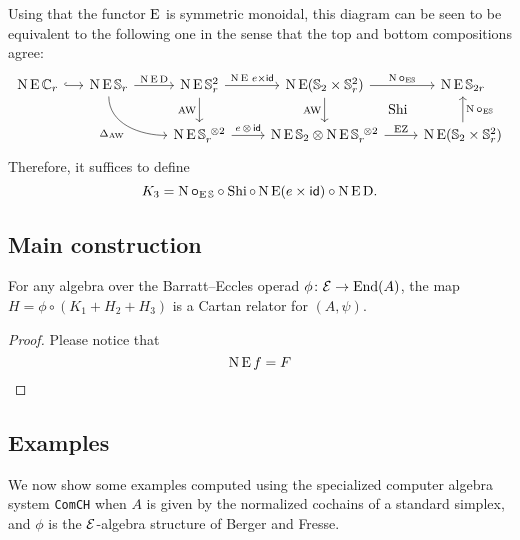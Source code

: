 Using that the functor $\operatorname{E}$ is symmetric monoidal, this diagram can be seen to be equivalent to the following one in the sense that the top and bottom compositions agree:
\[
\begin{tikzcd}
	\chains\EE\cyc_r
	\rar[hook]
	&[-10pt]
	\chains\EE\sym_r
	\rar["\chains\EE\rD"]
	\arrow[dr,in=180,out=-90,"\Delta_{\AW}"'] &
	\chains\EE\sym_r^2
	\rar["\chains\EE \, e \times \id"]
	\dar["\AW"'] &[0pt]
	\chains\EE(\sym_2 \times \sym_r^2)
	\rar["\chains\bcirc_{\EE\!\sym}"]
	\dar["\AW"']&
	\chains\EE\sym_{2r} \\ & &
	\chains\EE\sym_r^{\ \ot 2}
	\rar["e \,\ot\, \id"] &
	\chains\EE\sym_2 \ot \chains\EE\sym_r^{\ \ot 2}
	\rar["\EZ"]
	\urar["\Shi",phantom] &
	\chains\EE(\sym_2 \times \sym_r^2)
	\uar["\chains\bcirc_{\EE\!\sym}"']
\end{tikzcd}
\]
Therefore, it suffices to define
\[
K_3 = \operatorname{N}\bm{\circ}_{\operatorname{E}\mathbb{S}} \circ \operatorname{Shi} \circ \operatorname{N}\operatorname{E}(e \times \mathsf{id}) \circ \operatorname{N}\operatorname{E}\mathrm{D}.
\]

\subsection{Main construction}

\begin{theorem}
	For any algebra over the Barratt--Eccles operad $\phi \colon \mathcal{E} \to \mathrm{End}(A)$, the map $H = \phi \circ (K_1 + H_2 + H_3)$ is a Cartan relator for $(A,\psi)$.
\end{theorem}

\begin{proof}

	Please notice that
	\[
	\operatorname{N}\operatorname{E} f = F
	\]
\end{proof}

\subsection{Examples}

We now show some examples computed using the specialized computer algebra system \texttt{ComCH} \cite{medina2021comch} when $A$ is given by the normalized cochains of a standard simplex, and $\phi$ is the $\mathcal{E}$-algebra structure of Berger and Fresse.

